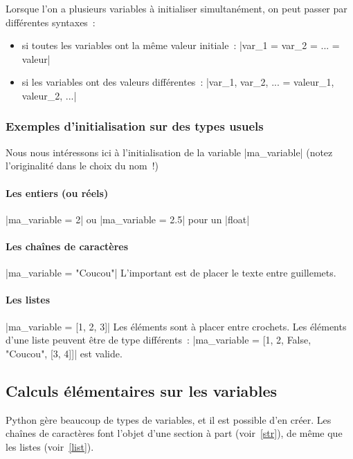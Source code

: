 		Lorsque l'on a plusieurs variables à initialiser simultanément, on peut passer par différentes syntaxes~:
		\begin{itemize}
			\item si toutes les variables ont la même valeur initiale~: \python|var_1 = var_2 = ... = valeur|
			\item si les variables ont des valeurs différentes~: \newline \python|var_1, var_2, ... = valeur_1, valeur_2, ...|
		\end{itemize}
		
		\subsubsection{Exemples d'initialisation sur des types usuels}
		Nous nous intéressons ici à l'initialisation de la variable \python|ma_variable| (notez l'originalité dans le choix du nom~!)
		\paragraph{Les entiers (ou réels)} \python|ma_variable = 2| ou \python|ma_variable = 2.5| pour un \python|float|
		\paragraph{Les chaînes de caractères} \python|ma_variable = "Coucou"| L'important est de placer le texte entre guillemets.
		\paragraph{Les listes} \python|ma_variable = [1, 2, 3]| Les éléments sont à placer entre crochets. Les éléments d'une liste peuvent être de type différents~: \python|ma_variable = [1, 2, False, "Coucou", [3, 4]]| est valide.

	\subsection{Calculs élémentaires sur les variables}
	
		Python gère beaucoup de types de variables, et il est possible d'en créer. Les chaînes de caractères font l'objet d'une section à part (voir~\ref{str}), de même que les listes (voir~\ref{list}). \\
	
